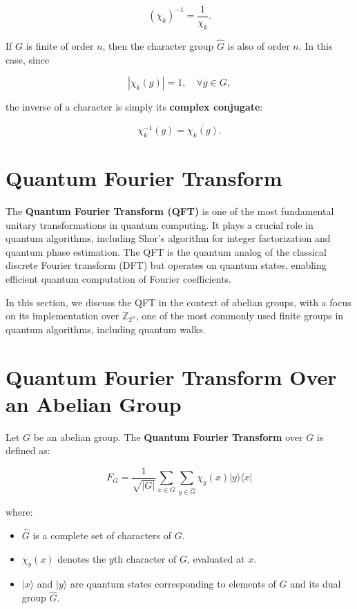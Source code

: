 \documentclass[11pt]{article}
\theoremstyle{definition}
\begin{document}
\[
(\chi_k)^{-1} = \frac{1}{\chi_k}.
\]

If \( G \) is finite of order \( n \), then the character group \( \hat{G} \) is also of order \( n \). In this case, since  

\[
|\chi_k(g)| = 1, \quad \forall g \in G,
\]

the inverse of a character is simply its \textbf{complex conjugate}:

\[
\chi_k^{-1}(g) = \overline{\chi_k(g)}.
\]



\section{Quantum Fourier Transform}

The \textbf{Quantum Fourier Transform (QFT)} is one of the most fundamental unitary transformations in quantum computing. It plays a crucial role in quantum algorithms, including Shor’s algorithm for integer factorization and quantum phase estimation. The QFT is the quantum analog of the classical discrete Fourier transform (DFT) but operates on quantum states, enabling efficient quantum computation of Fourier coefficients.

In this section, we discuss the QFT in the context of abelian groups, with a focus on its implementation over \( \mathbb{Z}_{2^n} \), one of the most commonly used finite groups in quantum algorithms, including quantum walks.

\section{Quantum Fourier Transform Over an Abelian Group}

Let \( G \) be an abelian group. The \textbf{Quantum Fourier Transform} over \( G \) is defined as:

\[
F_G = \frac{1}{\sqrt{|G|}} \sum_{x \in G} \sum_{y \in \hat{G}} \chi_y(x) | y \rangle \langle x |
\]

where:

\begin{itemize}
    \item \( \hat{G} \) is a complete set of characters of \( G \).
    \item \( \chi_y(x) \) denotes the \( y \)th character of \( G \), evaluated at \( x \).
    \item \( |x\rangle \) and \( |y\rangle \) are quantum states corresponding to elements of \( G \) and its dual group \( \hat{G} \).
\end{itemize}
\end{document}
